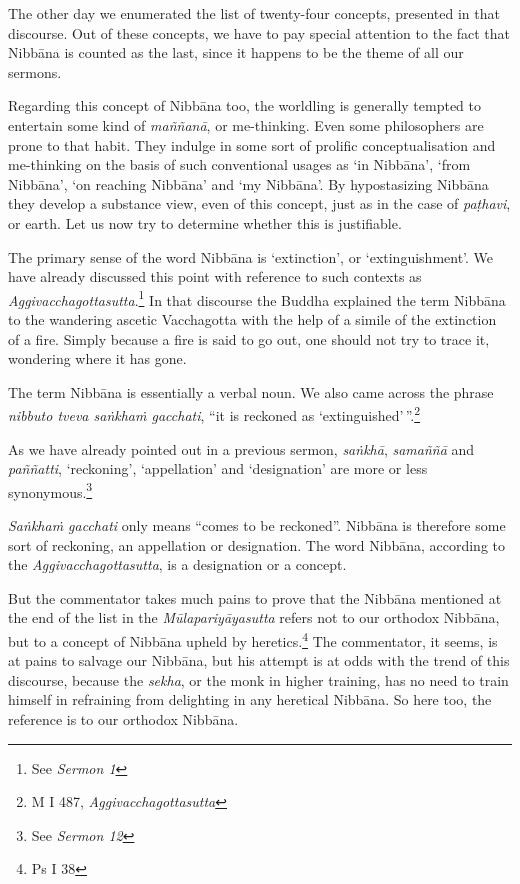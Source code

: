 The other day we enumerated the list of twenty-four concepts, presented in that discourse. Out of these concepts, we have to pay special attention to the fact that Nibbāna is counted as the last, since it happens to be the theme of all our sermons.

Regarding this concept of Nibbāna too, the worldling is generally tempted to entertain some kind of \emph{maññanā}, or me-thinking. Even some philosophers are prone to that habit. They indulge in some sort of prolific conceptualisation and me-thinking on the basis of such conventional usages as `in Nibbāna', `from Nibbāna', `on reaching Nibbāna' and `my Nibbāna'. By hypostasizing Nibbāna they develop a substance view, even of this concept, just as in the case of \emph{paṭhavi}, or earth. Let us now try to determine whether this is justifiable.

The primary sense of the word Nibbāna is `extinction', or `extinguishment'. We have already discussed this point with reference to such contexts as \emph{Aggivacchagottasutta}.\footnote{See \emph{Sermon 1}} In that discourse the Buddha explained the term Nibbāna to the wandering ascetic Vacchagotta with the help of a simile of the extinction of a fire. Simply because a fire is said to go out, one should not try to trace it, wondering where it has gone.

The term Nibbāna is essentially a verbal noun. We also came across the phrase \emph{nibbuto tveva saṅkhaṁ gacchati}, ``it is reckoned as `extinguished'\,''.\footnote{M I 487, \emph{Aggivacchagottasutta}}

As we have already pointed out in a previous sermon, \emph{saṅkhā}, \emph{samaññā} and \emph{paññatti}, `reckoning', `appellation' and `designation' are more or less synonymous.\footnote{See \emph{Sermon 12}}

\emph{Saṅkhaṁ gacchati} only means ``comes to be reckoned''. Nibbāna is therefore some sort of reckoning, an appellation or designation. The word Nibbāna, according to the \emph{Aggivacchagottasutta}, is a designation or a concept.

But the commentator takes much pains to prove that the Nibbāna mentioned at the end of the list in the \emph{Mūlapariyāyasutta} refers not to our orthodox Nibbāna, but to a concept of Nibbāna upheld by heretics.\footnote{Ps I 38} The commentator, it seems, is at pains to salvage our Nibbāna, but his attempt is at odds with the trend of this discourse, because the \emph{sekha}, or the monk in higher training, has no need to train himself in refraining from delighting in any heretical Nibbāna. So here too, the reference is to our orthodox Nibbāna.

